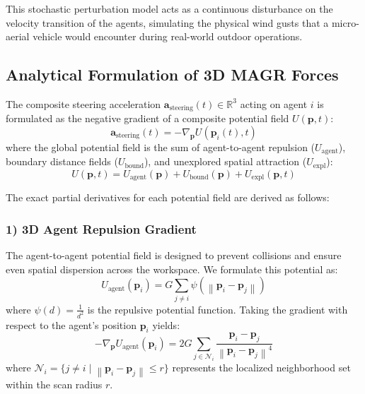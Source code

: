 \documentclass[letterpaper, 10pt, conference]{IEEEtran}
\newcommand{\norm}[1]{\left\lVert#1\right\rVert}
\begin{document}
This stochastic perturbation model acts as a continuous disturbance on the velocity transition of the agents, simulating the physical wind gusts that a micro-aerial vehicle would encounter during real-world outdoor operations.

\subsection{Analytical Formulation of 3D MAGR Forces}
The composite steering acceleration $\mathbf{a}_{\text{steering}}(t) \in \mathbb{R}^3$ acting on agent $i$ is formulated as the negative gradient of a composite potential field $U(\mathbf{p}, t)$:
\begin{equation}
    \mathbf{a}_{\text{steering}}(t) = -\nabla_{\mathbf{p}} U(\mathbf{p}_i(t), t)
\end{equation}
where the global potential field is the sum of agent-to-agent repulsion ($U_{\text{agent}}$), boundary distance fields ($U_{\text{bound}}$), and unexplored spatial attraction ($U_{\text{expl}}$):
\begin{equation}
    U(\mathbf{p}, t) = U_{\text{agent}}(\mathbf{p}) + U_{\text{bound}}(\mathbf{p}) + U_{\text{expl}}(\mathbf{p}, t)
\end{equation}

The exact partial derivatives for each potential field are derived as follows:
\subsubsection{1) 3D Agent Repulsion Gradient}
The agent-to-agent potential field is designed to prevent collisions and ensure even spatial dispersion across the workspace. We formulate this potential as:
\begin{equation}
    U_{\text{agent}}(\mathbf{p}_i) = G \sum_{j \neq i} \psi(\norm{\mathbf{p}_i - \mathbf{p}_j})
\end{equation}
where $\psi(d) = \frac{1}{d^2}$ is the repulsive potential function. Taking the gradient with respect to the agent's position $\mathbf{p}_i$ yields:
\begin{equation}
    -\nabla_{\mathbf{p}} U_{\text{agent}}(\mathbf{p}_i) = 2 G \sum_{j \in \mathcal{N}_i} \frac{\mathbf{p}_i - \mathbf{p}_j}{\norm{\mathbf{p}_i - \mathbf{p}_j}^4}
\end{equation}
where $\mathcal{N}_i = \{j \neq i \mid \norm{\mathbf{p}_i - \mathbf{p}_j} \leq r\}$ represents the localized neighborhood set within the scan radius $r$.
\end{document}
